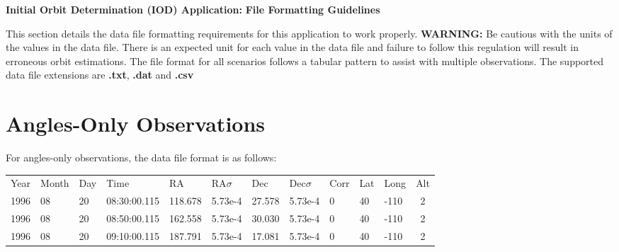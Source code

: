 \documentclass{article}
\begin{document}
	\newpage
	\begin{center}
	\textbf{{\large Initial Orbit Determination (IOD) Application:}} \newline
	\textbf{{\large File Formatting Guidelines}}
	\end{center}
	
		\hspace{0.45 cm} This section details the data file formatting requirements for this application to work properly. \textbf{WARNING:} Be cautious with the units of the values in the data file. There is an 
                expected unit for each value in the data file and failure to follow this regulation will result in erroneous orbit estimations. The file format for all scenarios follows a tabular pattern to assist with multiple 
                observations. \newline\newline
		The supported data file extensions are \textbf{.txt}, \textbf{.dat} and \textbf{.csv}
			\section{Angles-Only Observations}
				For angles-only observations, the data file format is as follows:
			       
			       \begin{center}
				{\footnotesize
			       \begin{tabular} {p{0.5 cm} p{0.75 cm} p{0.50 cm} p{1.5 cm} p{0.90 cm} p{1.10cm} p{0.80 cm} p{1.10 cm} p{0.55 cm} p{0.45 cm} p{0.55 cm} c}
				
				Year  & Month & Day & Time & RA & RA$\sigma$ & Dec & Dec$\sigma$ & Corr & Lat & Long & Alt\\
				1996 & 08 & 20 & 08:30:00.115 & 118.678 & 5.73e-4 & 27.578 & 5.73e-4 & 0 & 40 & -110 & 2\\
				1996 & 08 & 20 & 08:50:00.115 & 162.558 & 5.73e-4 & 30.030 & 5.73e-4 & 0 & 40 & -110 & 2\\
				1996 & 08 & 20 & 09:10:00.115 & 187.791 & 5.73e-4 & 17.081 & 5.73e-4 & 0 & 40 & -110 & 2\\
				\end{tabular}
				}
				\end{center}
				
\end{document}
